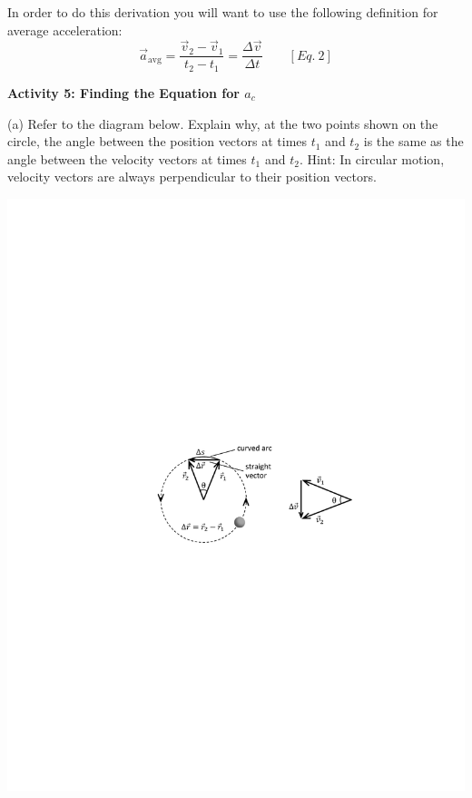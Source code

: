 In order to do this derivation you will want to use the following definition
for average acceleration:
\[
 {\vec a}_{\mathrm{avg}} =\frac{{{\vec v}_{2}}-{{\vec v}_{1}}}
{t_{2}-t_{1}}=\frac{\Delta {\vec v}}{\Delta t}\qquad [Eq.\: 2]\]


\pagebreak[3]
\textbf{Activity 5: Finding the Equation for \(a _{c} \) }

(a) Refer to the diagram below. Explain why, at the two points shown on the
circle, the angle between the position vectors at times \( t_{1} \) and \( t_{2} \)
is the same as the angle between the velocity vectors at times \( t_{1} \)
and \( t_{2} \). Hint: In circular motion, velocity vectors are always perpendicular
to their position vectors.

\vspace{0.3cm}
{\par\raggedright \includegraphics{circ_motion/circ_motion_fig3_new.pdf} \par}
\vspace{0.3cm}

